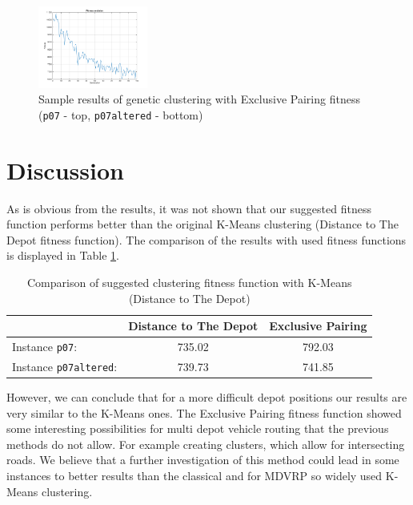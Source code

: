 \documentclass[conference]{IEEEtran}
\begin{document}
\begin{figure}
\begin{center}
    \includegraphics[width=0.32\textwidth]{images/N3fitness_p07altered}
    \caption{Sample results of genetic clustering with Exclusive Pairing fitness (\texttt{p07} - top, \texttt{p07altered} - bottom)}
    \label{n3res}
  \end{center}
\end{figure}




\section{Discussion}
As is obvious from the results, it was not shown that our suggested fitness function performs better than the original K-Means clustering (Distance to The Depot fitness function). The comparison of the results with used fitness functions is displayed in Table \ref{mcomp}.
\begin{table}[b]
  \begin{center}
    \caption{Comparison of suggested clustering fitness function with K-Means (Distance to The Depot)}
    \begin{tabular}{l | c | c }
     & Distance to The Depot & Exclusive Pairing \\
    \hline
    Instance \texttt{p07}: & 735.02 & 792.03 \\
    \hline
    Instance \texttt{p07altered}: & 739.73 & 741.85 \\
    \hline 
    \end{tabular}
    \label{mcomp}
  \end{center}
\end{table}

However, we can conclude that for a more difficult depot positions our results are very similar to the K-Means ones. The Exclusive Pairing fitness function showed some interesting possibilities for multi depot vehicle routing that the previous methods do not allow. For example creating clusters, which allow for intersecting roads. We believe that a further investigation of this method could lead in some instances to better results than the classical and for MDVRP so widely used K-Means clustering.
\end{document}
